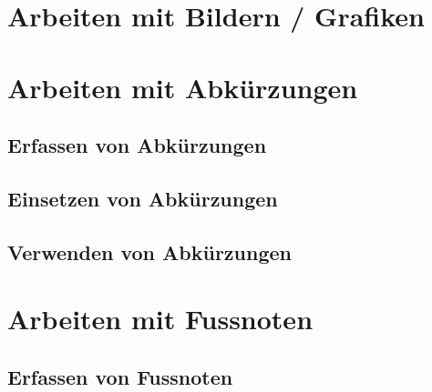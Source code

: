 \documentclass[12pt, a4paper, sectionentrydots=true, listof=totoc, listof=entryprefix, numbers=endperiod]{scrartcl}
\begin{document}
\section{Arbeiten mit Bildern / Grafiken}
\label{Bilder}
\begin{spacing}{1.25}

\end{spacing}
%
%
%
%
%
%
\pagebreak 
\section{Arbeiten mit Abkürzungen}
\begin{spacing}{1.25}

\end{spacing}
%
%
\subsection{Erfassen von Abkürzungen}
\begin{spacing}{1.25}

\end{spacing}
%
%
\subsection{Einsetzen von Abkürzungen}
\begin{spacing}{1.25}

\end{spacing}
%
%
\subsection{Verwenden von Abkürzungen}
\begin{spacing}{1.25}

\end{spacing}
%
%
%
%
%
%
\pagebreak 
\section{Arbeiten mit Fussnoten}
\begin{spacing}{1.25}

\end{spacing}
%
%
\subsection{Erfassen von Fussnoten}
\begin{spacing}{1.25}

\end{spacing}
%
%
%
%
%
%
\pagebreak 
\end{document}
